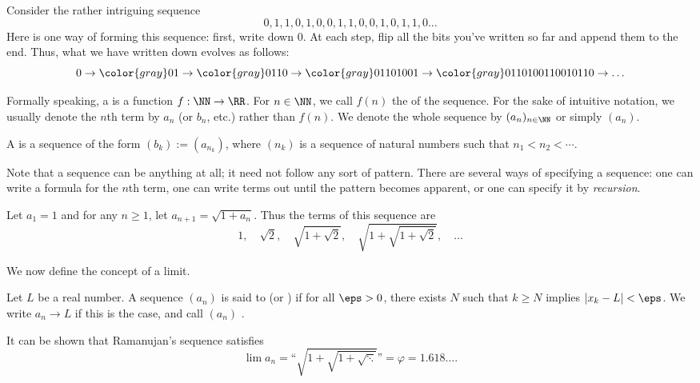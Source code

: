 \begin{example} %
Consider the rather intriguing sequence
\[ 0, 1, 1, 0, 1, 0, 0, 1, 1, 0, 0, 1, 0, 1, 1, 0... \]
Here is one way of forming this sequence: first, write down 0. At each step, flip all the bits you've written so far and append them to the end. Thus, what we have written down evolves as follows:
\[ 0 \to {\color{gray}0}1 \to {\color{gray}01}10 \to {\color{gray}0110}1001 \to {\color{gray}01101001}10010110 \to \ldots \]
\end{example}

\begin{definition}
Formally speaking, a  is a function $f : \NN \to \RR$. For $n \in \NN$, we call $f(n)$ the  of the sequence. For the sake of intuitive notation, we usually denote the $n$th term by $a_n$ (or $b_n$, etc.) rather than $f(n)$. We denote the whole sequence by $(a_n)_{n \in \NN}$ or simply $(a_n)$.

A  is a sequence of the form $(b_k) := (a_{n_k})$, where $(n_k)$ is a sequence of natural numbers such that $n_1 < n_2 < \cdots$.
\end{definition}

Note that a sequence can be anything at all; it need not follow any sort of pattern. There are several ways of specifying a sequence: one can write a formula for the $n$th term, one can write terms out until the pattern becomes apparent, or one can specify it by \emph{recursion}.

\begin{example}[Ramanujan]
Let $a_1 = 1$ and for any $n \geq 1$, let $a_{n+1} = \sqrt{1+a_n}$. Thus the terms of this sequence are
\[ 1, \quad \sqrt{2}, \quad \sqrt{1+\sqrt{2}}, \quad \sqrt{1+\sqrt{1+\sqrt{2}}}, \quad \ldots \]
\end{example}

We now define the concept of a limit.

\begin{definition}
Let $L$ be a real number. A sequence $(a_n)$ is said to  (or ) if for all $\eps > 0$, there exists $N$ such that $k \geq N$ implies $|x_k - L| < \eps$. We write $a_n \to L$ if this is the case, and call $(a_n)$ .
\end{definition}

\begin{remark}
It can be shown that Ramanujan's sequence satisfies
\[ \lim a_n = \text{``$\sqrt{1+\sqrt{1+\sqrt{\ddots}}}$''} = \varphi = 1.618\ldots. \]
\end{remark}

